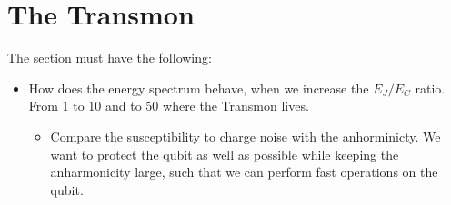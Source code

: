 \section{The Transmon}
The section must have the following:
\begin{itemize}
    \item How does the energy spectrum behave, when we increase the $E_J / E_C$ ratio. From 1 to 10 and to 50 where the Transmon lives.
    \begin{itemize}
        \item Compare the susceptibility to charge noise with the anhorminicty. We want to protect the qubit as well as possible while keeping the anharmonicity large, such that we can perform fast operations on the qubit. 
    \end{itemize}
\end{itemize}



